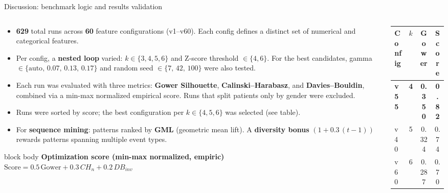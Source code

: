 \documentclass[aspectratio=169,11pt]{beamer}
\newcommand{\stat}[1]{{\color{hosporange}\bfseries #1}}
\newcommand{\kw}[1]{{\color{hospaccent}\bfseries #1}}
\newcommand{\formulabox}[2]{%
  \begin{beamercolorbox}[wd=\linewidth,rounded=true,shadow=false,sep=6pt]{block body}%
    {\color{hospaccent}\footnotesize\bfseries #1}\\[2pt]%
    \centering #2%
  \end{beamercolorbox}}
\begin{document}
\begin{frame}{Discussion: benchmark logic and results validation}
  \begin{columns}[T]
    \begin{column}{0.65\textwidth}
      \scriptsize
      \begin{itemize}\setlength{\itemsep}{0.3em}
        \item \stat{629} total runs across \stat{60} feature configurations (v1--v60). Each config defines a distinct set of numerical and categorical features.
        \item Per config, a \kw{nested loop} varied: $k \in \{3,4,5,6\}$ and Z-score threshold $\in \{4,6\}$. For the best candidates, gamma $\in \{\text{auto},\,0.07,\,0.13,\,0.17\}$ and random seed $\in \{7,\,42,\,100\}$ were also tested.
        \item Each run was evaluated with three metrics: \kw{Gower Silhouette}, \kw{Calinski--Harabasz}, and \kw{Davies--Bouldin}, combined via a min-max normalized empirical score. Runs that split patients only by gender were excluded.
        \item Runs were sorted by score; the best configuration per $k \in \{4,5,6\}$ was selected (see table).
        \item For \kw{sequence mining}: patterns ranked by \kw{GML} (geometric mean lift). A \kw{diversity bonus} $(1+0.3\,(t-1))$ rewards patterns spanning multiple event types.
      \end{itemize}
      \vspace{0.25em}
      \formulabox{Optimization score (min-max normalized, empiric)}{%
        $\text{Score}=0.5\,\text{Gower}+0.3\,CH_{n}+0.2\,DB_{\mathit{inv}}$}
    \end{column}
    \begin{column}{0.35\textwidth}
      \centering
      \scriptsize
      \renewcommand{\arraystretch}{1.2}
      \begin{tabular}{@{}l c c c@{}}
        \toprule
        Config & $k$ & Gower & Score \\
        \midrule
        \rowcolor{hosplight}\textbf{v55} & \textbf{4} & \textbf{0.350} & \textbf{0.82} \\
        v40 & 5 & 0.324 & 0.74 \\
        v60 & 6 & 0.287 & 0.70 \\
        \bottomrule
      \end{tabular}


\end{column}
\end{columns}
\end{frame}
\end{document}
